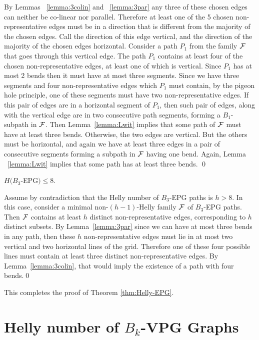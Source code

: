 By Lemmas ~\ref{lemma:3colin} and ~\ref{lemma:3par} any three of these chosen edges can  neither be co-linear nor parallel. Therefore at least one of the 5 chosen non-representative edges must be in a direction that is different from the majority of the chosen edges. Call the direction of this edge vertical, and the direction of the majority of the chosen edges horizontal. Consider a path $P_1$ from the family $\cal F$ that goes through this vertical edge. 
The path $P_1$ contains at least four of the chosen non-representative edges, at least one of which is vertical. Since $P_1$ has at most 2 bends then it must have at most three segments. Since we have three segments and four non-representative edges which $P_1$ must contain, by the pigeon hole principle, one of these segments must have two non-representative edges. If this pair of edges are in a horizontal segment of $P_1$, then such  pair of edges, along with the vertical edge are in two consecutive path segments, forming a $B_1$-subpath in $\cal F$. Then Lemma~\ref{lemma:Lwit} implies that some path of $\cal F$ must have at least three bends.   Otherwise, the two edges are vertical. But  the others must be horizontal, and again we have at least three edges in a pair of consecutive segments forming a subpath in $\cal F$ having one bend. Again,  Lemma ~\ref{lemma:Lwit} implies that some path has at least three bends.
\qed

\begin{lema}\label{claim:upper-B3}
$H(B_3$-EPG$) \leq 8.$
\end{lema}

\proof
Assume by contradiction that the Helly  number of  $B_3$-EPG paths is $h > 8$. In this case, consider a minimal non-$(h-1)$-Helly family $\cal F$ of $B_3$-EPG paths. Then $\cal F$ contains at least $h$  distinct non-representative edges,  corresponding to $h$ distinct subsets.  By Lemma~\ref{lemma:3par} since we can have at most three bends in any path, then these $h$  non-representative edges must lie in at most two vertical and two horizontal lines of the grid. Therefore one of these four possible lines must contain at least three distinct non-representative edges. By Lemma~\ref{lemma:3colin},  that would imply the existence of a path with four bends.\qed

This completes the proof of Theorem \ref{thm:Helly-EPG}. 


\section{Helly number of $B_k$-VPG Graphs}

